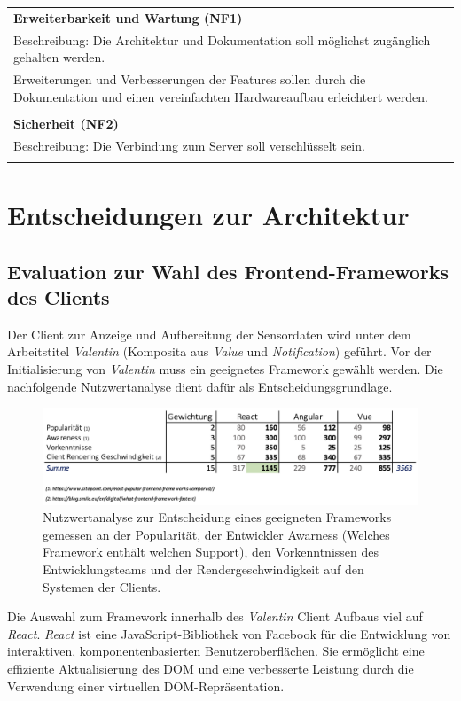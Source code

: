\documentclass[
]{article}
\begin{document}
\begin{center}
  \begin{tabular}{|p{\linewidth}|}
    \hline
    \textbf{Erweiterbarkeit und Wartung (NF1)} \\
    Beschreibung: Die Architektur und Dokumentation soll möglichst zugänglich gehalten werden. \\
    Erweiterungen und Verbesserungen der Features sollen durch die Dokumentation und einen vereinfachten Hardwareaufbau erleichtert werden. \\ \\
    \hline
    \textbf{Sicherheit (NF2)} \\
    Beschreibung: Die Verbindung zum Server soll verschlüsselt sein. \\ \\
    \hline
  \end{tabular}
\end{center}

\section{Entscheidungen zur Architektur}
\subsection{Evaluation zur Wahl des Frontend-Frameworks des Clients}

Der Client zur Anzeige und Aufbereitung der Sensordaten wird unter dem Arbeitstitel \textit{Valentin} (Komposita aus \textit{Value} und \textit{Notification}) geführt. Vor der Initialisierung von \textit{Valentin} muss ein geeignetes Framework gewählt werden. Die nachfolgende Nutzwertanalyse dient dafür als Entscheidungsgrundlage. 

\begin{figure}
  \centering
  \includegraphics[width=1\textwidth]{./resources/techevaluationfe.png}
  \caption{Nutzwertanalyse zur Entscheidung eines geeigneten Frameworks gemessen an der Popularität, der Entwickler Awarness (Welches Framework enthält welchen Support), den Vorkenntnissen des Entwicklungsteams und der Rendergeschwindigkeit auf den Systemen der Clients.}
  \label{fig:deine_label}
\end{figure}

Die Auswahl zum Framework innerhalb des \textit{Valentin} Client Aufbaus viel auf \textit{React}. \textit{React} ist eine JavaScript-Bibliothek von Facebook für die Entwicklung von interaktiven, komponentenbasierten Benutzeroberflächen. Sie ermöglicht eine effiziente Aktualisierung des DOM und eine verbesserte Leistung durch die Verwendung einer virtuellen DOM-Repräsentation.
\end{document}
